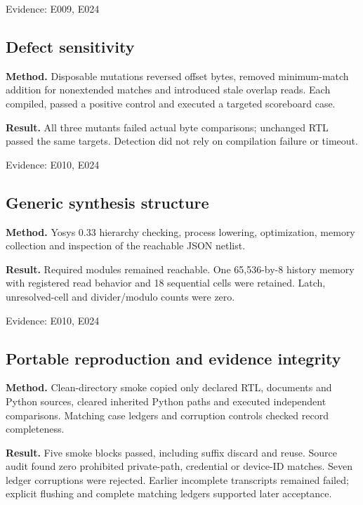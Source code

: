 \documentclass[11pt,a4paper]{article}
\begin{document}
{\small Evidence: E009,\allowbreak{} E024}

\subsection{Defect sensitivity}

\textbf{Method.} Disposable mutations reversed offset bytes,\allowbreak{} removed minimum-match addition for nonextended matches and introduced stale overlap reads. Each compiled,\allowbreak{} passed a positive control and executed a targeted scoreboard case.

\textbf{Result.} All three mutants failed actual byte comparisons; unchanged RTL passed the same targets. Detection did not rely on compilation failure or timeout.

{\small Evidence: E010,\allowbreak{} E024}

\subsection{Generic synthesis structure}

\textbf{Method.} Yosys 0.33 hierarchy checking,\allowbreak{} process lowering,\allowbreak{} optimization,\allowbreak{} memory collection and inspection of the reachable JSON netlist.

\textbf{Result.} Required modules remained reachable. One 65,\allowbreak{}536-by-8 history memory with registered read behavior and 18 sequential cells were retained. Latch,\allowbreak{} unresolved-cell and divider/\allowbreak{}modulo counts were zero.

{\small Evidence: E010,\allowbreak{} E024}

\subsection{Portable reproduction and evidence integrity}

\textbf{Method.} Clean-directory smoke copied only declared RTL,\allowbreak{} documents and Python sources,\allowbreak{} cleared inherited Python paths and executed independent comparisons. Matching case ledgers and corruption controls checked record completeness.

\textbf{Result.} Five smoke blocks passed,\allowbreak{} including suffix discard and reuse. Source audit found zero prohibited private-path,\allowbreak{} credential or device-ID matches. Seven ledger corruptions were rejected. Earlier incomplete transcripts remained failed; explicit flushing and complete matching ledgers supported later acceptance.
\end{document}
